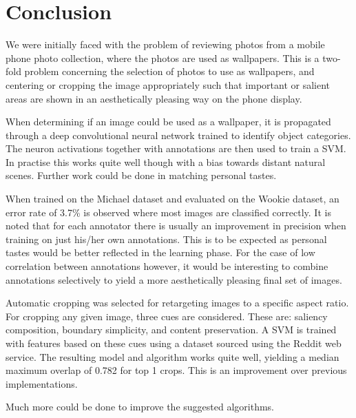 %

\chapter{Conclusion}

We were initially faced with the problem of reviewing photos from a mobile phone
photo collection, where the photos are used as wallpapers.
This is a two-fold problem concerning the selection of photos to use as
wallpapers, and centering or cropping the image appropriately such that
important or salient areas are shown in an aesthetically pleasing way on the
phone display.

When determining if an image could be used as a wallpaper, it is propagated
through a deep convolutional neural network trained to identify object
categories.
The neuron activations together with annotations are then used to train a SVM.
In practise this works quite well though with a bias towards distant natural
scenes.
Further work could be done in matching personal tastes.

When trained on the Michael dataset and evaluated on the Wookie dataset, an
error rate of 3.7\% is observed where most images are classified correctly.
It is noted that for each annotator there is usually an improvement in precision
when training on just his/her own annotations.
This is to be expected as personal tastes would be better reflected in the
learning phase.
For the case of low correlation between annotations however, it would be
interesting to combine annotations selectively to yield a more aesthetically
pleasing final set of images.

Automatic cropping was selected for retargeting images to a specific aspect
ratio.
For cropping any given image, three cues are considered.
These are: saliency composition, boundary simplicity, and content preservation.
A SVM is trained with features based on these cues using a dataset sourced using
the Reddit web service.
The resulting model and algorithm works quite well, yielding a median maximum
overlap of 0.782 for top 1 crops.
This is an improvement over previous implementations.

Much more could be done to improve the suggested algorithms.


